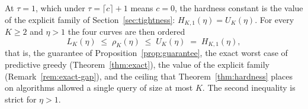 \begin{remark}\label{rem:hardness-chain}
At $\tau=1$, which under $\tau=\lceil c\rceil+1$ means $c=0$, the hardness
constant is the value of the explicit family of Section~\ref{sec:tightness}:
$H_{K,1}(\eta)=U_K(\eta)$.  For every $K\ge2$ and $\eta>1$ the four curves are
then ordered
\[
  L_K(\eta)\;\le\;\rho_K(\eta)\;\le\;U_K(\eta)\;=\;H_{K,1}(\eta),
\]
that is, the guarantee of Proposition~\ref{prop:guarantee}, the exact
worst case of predictive greedy (Theorem~\ref{thm:exact}), the value of the
explicit family (Remark~\ref{rem:exact-gap}), and the ceiling that
Theorem~\ref{thm:hardness} places on algorithms allowed a single query of
size at most $K$.  The second inequality is strict for $\eta>1$.
\end{remark}


